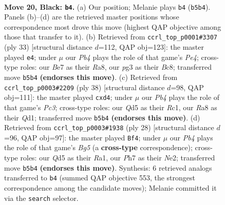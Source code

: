 \documentclass[11pt]{article}
\begin{document}
\clearpage

\begin{figure}[p]\centering
\begin{subfigure}{0.46\textwidth}\centering
\resizebox{\linewidth}{!}{%
\newchessgame
\chessboard[
  setfen={r1b1r1k1/p2nb2p/2p2pp1/1p1q4/P2p3P/1P1Q1PP1/3NPK2/RNB2R2 b - - 0 20},
  showmover=false,
  pgfstyle=straightmove, color=movearrow, markmove={b5-b4}
]}
\caption{}
\end{subfigure}\hfill
\begin{subfigure}{0.46\textwidth}\centering
\resizebox{\linewidth}{!}{%
\newchessgame
\chessboard[
  setfen={r1b1r1k1/1p1nqpp1/2p4p/4p3/p1QP4/P3PN2/1P2BPPP/2R1R1K1 b - - 1 17},
  showmover=false,
  pgfstyle=straightmove, color=movearrow, markmove={e5-e4}
]}
\caption{}
\end{subfigure}
\\[4pt]
\begin{subfigure}{0.46\textwidth}\centering
\resizebox{\linewidth}{!}{%
\newchessgame
\chessboard[
  setfen={3r2k1/pbqn1pp1/1p2rn1p/8/P2ppP2/2P1P2P/1B1N2P1/2RQRBK1 w - - 0 20},
  showmover=false,
  pgfstyle=straightmove, color=movearrow, markmove={c3-d4}
]}
\caption{}
\end{subfigure}\hfill
\begin{subfigure}{0.46\textwidth}\centering
\resizebox{\linewidth}{!}{%
\newchessgame
\chessboard[
  setfen={rnb2rk1/p2p1ppp/1n2p3/1p2q1B1/4P2P/PQ3PP1/1P2N3/R3KB1R w KQ - 2 15},
  showmover=false,
  pgfstyle=straightmove, color=movearrow, markmove={g5-f4}
]}
\caption{}
\end{subfigure}
\caption{\textbf{Move 20, Black: \texttt{b4}.} (a) Our position; Melanie plays \texttt{b4} (\texttt{b5b4}). Panels (b)--(d) are the retrieved master positions whose correspondence most drove this move (highest QAP objective among those that transfer to it). (b) Retrieved from \texttt{ccrl\_top\_p0001\#3307} (ply 33) [structural distance $d$=112, QAP obj=123]: the master played \texttt{e4}; under $\mu$ our \emph{Pb4} plays the role of that game's \emph{Pe4}; cross-type roles: our \emph{B}e7 as their \emph{R}a8, our \emph{p}g3 as their \emph{B}c8; transferred move \texttt{b5b4} \textbf{(endorses this move)}. (c) Retrieved from \texttt{ccrl\_top\_p0003\#2209} (ply 38) [structural distance $d$=98, QAP obj=111]: the master played \texttt{cxd4}; under $\mu$ our \emph{Pb4} plays the role of that game's \emph{Pc3}; cross-type roles: our \emph{Q}d5 as their \emph{R}c1, our \emph{R}a8 as their \emph{Q}d1; transferred move \texttt{b5b4} \textbf{(endorses this move)}. (d) Retrieved from \texttt{ccrl\_top\_p0003\#1938} (ply 28) [structural distance $d$=96, QAP obj=97]: the master played \texttt{Bf4}; under $\mu$ our \emph{Pb4} plays the role of that game's \emph{Bg5} (a \textbf{cross-type} correspondence); cross-type roles: our \emph{Q}d5 as their \emph{R}a1, our \emph{P}h7 as their \emph{N}e2; transferred move \texttt{b5b4} \textbf{(endorses this move)}. Synthesis: 6 retrieved analogs transferred to \texttt{b4} (summed QAP objective 553, the strongest correspondence among the candidate moves); Melanie committed it via the \texttt{search} selector.}
\label{fig:thought-m39}
\end{figure}
\end{document}
